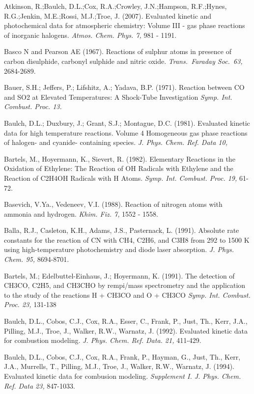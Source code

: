\documentclass[12pt,landscape]{article}
\newcounter{reaction}
\newcounter{photo}
\begin{document}
Atkinson, R.;Baulch, D.L.;Cox, R.A.;Crowley, J.N.;Hampson, R.F.;Hynes, R.G.;Jenkin, M.E.;Rossi, M.J.;Troe, J. (2007).  Evaluated kinetic and photochemical data for atmospheric chemistry: Volume III - gas phase reactions of inorganic halogens.
{\em Atmos. Chem. Phys. 7,} 981 - 1191.

Basco N and Pearson AE (1967). Reactions of sulphur atoms in presence of carbon disulphide, carbonyl sulphide and nitric oxide. {\em Trans.\ Faraday Soc.\ 63,} 2684-2689.

Bauer, S.H.; Jeffers, P.; Lifshitz, A.; Yadava, B.P. (1971).
Reaction between CO and SO2 at Elevated Temperatures: A Shock-Tube Investigation
{\em  Symp. Int. Combust. Proc. 13.}

Baulch, D.L.; Duxbury, J.; Grant, S.J.; Montague, D.C. (1981).  Evaluated kinetic data for high temperature reactions. Volume 4 Homogeneous gas phase reactions of halogen- and cyanide- containing species. {\em J. Phys. Chem. Ref. Data 10,} 

Bartels, M., Hoyermann, K., Sievert, R. (1982).  Elementary Reactions in the Oxidation of Ethylene: The Reaction of OH Radicals with Ethylene and the Reaction of C2H4OH Radicals with H Atoms.  {\em Symp. Int. Combust. Proc. 19,} 61-72.

Basevich, V.Ya., Vedeneev, V.I. (1988). Reaction of nitrogen atoms with ammonia and hydrogen. {\em Khim. Fiz. 7,} 1552 - 1558.

Balla, R.J., Casleton, K.H., Adams, J.S., Pasternack, L. (1991). Absolute rate constants for the reaction of CN with CH4, C2H6, and C3H8 from 292 to 1500 K using high-temperature photochemistry and diode laser absorption.  {\em J. Phys. Chem. 95,} 8694-8701.

Bartels, M.; Edelbuttel-Einhaus, J.; Hoyermann, K. (1991).
The detection of CH3CO, C2H5, and CH3CHO by rempi/mass spectrometry and the application to the study of the reactions H + CH3CO and O + CH3CO
{\em Symp. Int. Combust. Proc. 23,} 131-138

Baulch, D.L., Cobos, C.J., Cox, R.A., Esser, C., Frank, P., Just, Th., Kerr, J.A., Pilling, M.J., Troe, J., Walker, R.W., Warnatz, J. (1992). Evaluated kinetic data for combustion modeling. {\em J. Phys. Chem. Ref. Data. 21,} 411-429. 

Baulch, D.L., Cobos, C.J., Cox, R.A., Frank, P., Hayman, G., Just, Th., Kerr, J.A., Murrells, T., Pilling, M.J., Troe, J., Walker, R.W., Warnatz, J. (1994).  Evaluated kinetic data for combusion modeling. {\em Supplement I. J. Phys. Chem. Ref. Data 23,} 847-1033.
\end{document}
